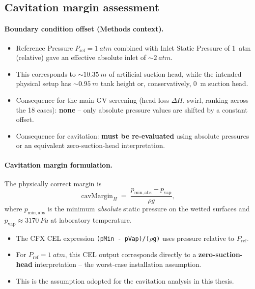 
\subsection{Cavitation margin assessment}
\label{sec:cav_discussion}

\paragraph{Boundary condition offset (Methods context).}
\begin{itemize}
    \item Reference Pressure $P_\mathrm{ref} = \SI{1}{atm}$ combined with Inlet Static Pressure of \SI{1}{atm} (relative) gave an effective absolute inlet of $\sim\!\SI{2}{atm}$.
    \item This corresponds to $\sim\!\SI{10.35}{m}$ of artificial suction head, while the intended physical setup has $\sim\!\SI{0.95}{m}$ tank height or, conservatively, \SI{0}{m} suction head.
    \item Consequence for the main GV screening (head loss $\Delta H$, swirl, ranking across the 18 cases): \textbf{none} -- only absolute pressure values are shifted by a constant offset.
    \item Consequence for cavitation: \textbf{must be re-evaluated} using absolute pressures or an equivalent zero-suction-head interpretation.
\end{itemize}

\paragraph{Cavitation margin formulation.}
The physically correct margin is
\begin{equation}
    \mathrm{cavMargin}_H \;=\; \frac{p_\mathrm{min,abs} - p_\mathrm{vap}}{\rho g},
    \label{eq:cavmargin}
\end{equation}
where $p_\mathrm{min,abs}$ is the minimum \emph{absolute} static pressure on the wetted surfaces and $p_\mathrm{vap} \approx \SI{3170}{Pa}$ at laboratory temperature.
\begin{itemize}
    \item The CFX CEL expression \texttt{(pMin - pVap)/($\rho$g)} uses pressure relative to $P_\mathrm{ref}$.
    \item For $P_\mathrm{ref} = \SI{1}{atm}$, this CEL output corresponds directly to a \textbf{zero-suction-head} interpretation -- the worst-case installation assumption.
    \item This is the assumption adopted for the cavitation analysis in this thesis.
\end{itemize}

